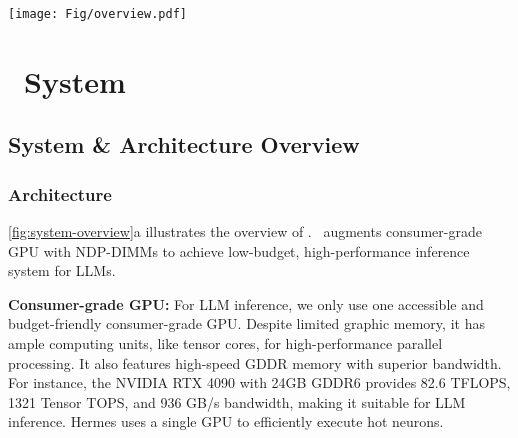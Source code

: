 \begin{figure*}
    \centering
    \texttt{[image: Fig/overview.pdf]}
    \vspace{-0.3cm}
    \caption{Overview of our proposed Hermes System. (a) Hermes augments GPU memory with NDP-DIMMs, and utilizes a scheduler to control the inference workflow. (b) Multiple NDP-DIMMs are connected to support LLM inference and inter-DIMM communication. }
    \label{fig:system-overview}
\vspace{-0.3cm}
\end{figure*}

\section{\name~System}\label{sec:hermes-system}
\subsection{System \& Architecture Overview}

\subsubsection{Architecture}

\fig\ref{fig:system-overview}a illustrates the overview of \name. \name~augments consumer-grade GPU with NDP-DIMMs to achieve low-budget, high-performance inference system for LLMs. 


\textbf{Consumer-grade GPU:} For LLM inference, we only use one accessible and budget-friendly consumer-grade GPU. Despite limited graphic memory, it has ample computing units, like tensor cores, for high-performance parallel processing. It also features high-speed GDDR memory with superior bandwidth. For instance, the NVIDIA RTX 4090 with 24GB GDDR6 provides 82.6 TFLOPS, 1321 Tensor TOPS, and 936 GB/s bandwidth, making it suitable for LLM inference. Hermes uses a single GPU to efficiently execute hot neurons.

